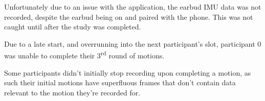 Unfortunately due to an issue with the application, the earbud IMU data was not recorded, despite the earbud being on and paired with the phone. This was not caught until after the study was completed.

Due to a late start, and overrunning into the next participant's slot, participant 0 was unable to complete their 3\textsuperscript{rd} round of motions.

Some participants didn't initially stop recording upon completing a motion, as such their initial motions have superfluous frames that don't contain data relevant to the motion they're recorded for.


